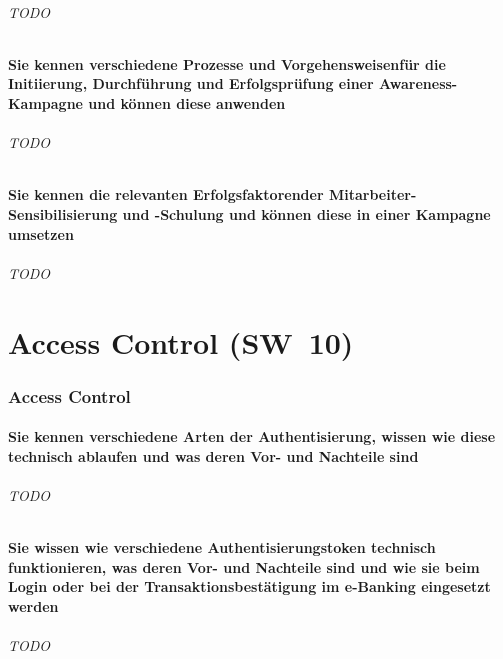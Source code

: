 \documentclass[10pt,a4paper]{article}
\begin{document}
\paragraph*{TODO}
\subsection*{Sie kennen verschiedene Prozesse und Vorgehensweisenfür die Initiierung, Durchführung und Erfolgsprüfung einer Awareness-Kampagne und können diese anwenden}
\paragraph*{TODO}
\subsection*{Sie kennen die relevanten Erfolgsfaktorender Mitarbeiter-Sensibilisierung und -Schulung und können diese in einer Kampagne umsetzen}
\paragraph*{TODO}



\part{Access Control (SW~10)}
\section{Access Control}
\subsection*{Sie kennen verschiedene Arten der Authentisierung, wissen wie diese technisch ablaufen und was deren Vor- und Nachteile sind}
\paragraph*{TODO}
\subsection*{Sie wissen wie verschiedene Authentisierungstoken technisch funktionieren, was deren Vor- und Nachteile sind und wie sie beim Login oder bei der Transaktionsbestätigung im e-Banking eingesetzt werden}
\paragraph*{TODO}
\end{document}
